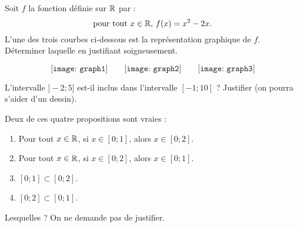 \documentclass[a4paper,11pt,DIV15,BCOR0mm]{scrartcl}
\begin{document}
\begin{exercice}
Soit $f$ la fonction définie sur $\mathbb{R}$ par :
\[
\text{pour tout $x\in\mathbb{R}$, }f(x) = x^2-2x.
\]
L'une des trois courbes ci-dessous est la représentation graphique de 
$f$. Déterminer laquelle en justifiant soigneusement.

\[
\texttt{[image: graph1]}\qquad
\texttt{[image: graph2]}\qquad
\texttt{[image: graph3]}
\]
\vfill
\vfill
\vfill
\end{exercice}

\begin{exercice}
L'intervalle $]-2;5]$ est-il inclus dans l'intervalle $[-1;10]$ ? Justifier (on pourra s'aider d'un dessin).
\vfill
\vfill
\end{exercice}

\begin{exercice}
Deux de ces quatre propositions sont vraies :
\begin{enumerate}
 \item Pour tout $x\in\mathbb{R}$, si $x\in [0;1]$, alors $x\in [0;2]$.
 \item Pour tout $x\in\mathbb{R}$, si $x\in [0;2]$, alors $x\in [0;1]$.
 \item $[0;1]\subset[0;2]$.
 \item $[0;2]\subset[0;1]$.
\end{enumerate}
Lesquelles ? On ne demande pas de justifier.
\vfill
\end{exercice}
\end{document}
